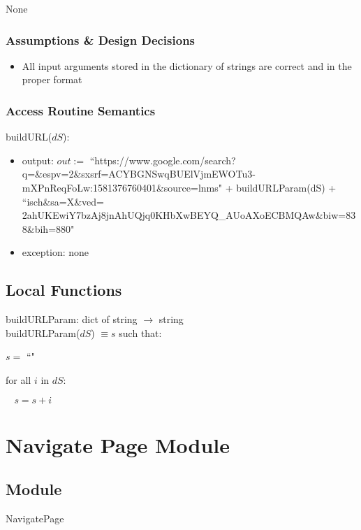 \documentclass{article}
\begin{document}
None

\subsubsection* {Assumptions \& Design Decisions}

\begin{itemize}
\item All input arguments stored in the dictionary of strings are correct and in the proper format
\end{itemize}

\subsubsection* {Access Routine Semantics}

\noindent buildURL($dS$):
\begin{itemize}
\item output: $out :=$ ``https://www.google.com/search?q=\&espv=2\&sxsrf=ACYBGNSwqBUElVjmEWOTu3-\linebreak
mXPnReqFoLw:1581376760401\&source=lnms" + buildURLParam(dS) + ``isch\&sa=X\&ved=\linebreak
2ahUKEwiY7bzAj8jnAhUQjq0KHbXwBEYQ\_AUoAXoECBMQAw\&biw=838\&bih=880"
\item exception: none
\end{itemize}

\subsection* {Local Functions}

\newpage

\noindent buildURLParam: dict of string $\rightarrow$ string \\
buildURLParam($\mathit{dS}$) $\equiv s$
such that:

$s =$ ``"

for all $i$ in $dS$:

$~~~~s = s + i$

\newpage
\section*{Navigate Page Module}

\subsection* {Module}

NavigatePage
\end{document}
